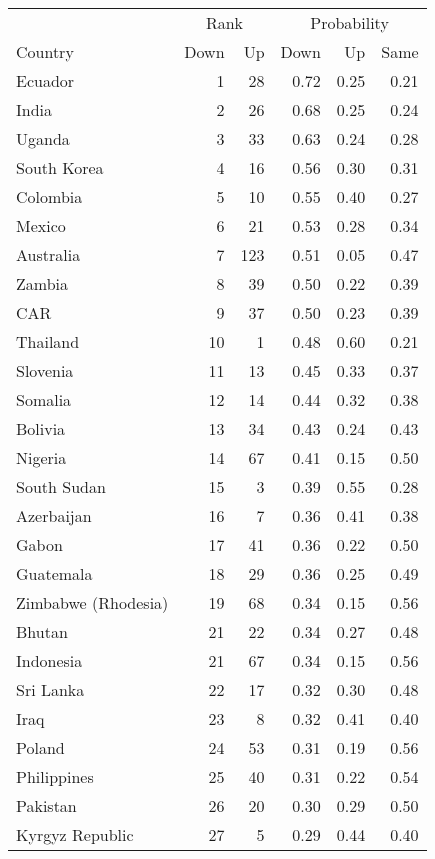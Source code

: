 
\begin{longtable}[t]{lrrrrr}
\toprule
\multicolumn{1}{c}{ } & \multicolumn{2}{c}{Rank} & \multicolumn{3}{c}{Probability} \\
\cmidrule(l{3pt}r{3pt}){2-3} \cmidrule(l{3pt}r{3pt}){4-6}
Country & Down & Up & Down & Up & Same\\
\midrule
Ecuador & 1 & 28 & 0.72 & 0.25 & 0.21\\
India & 2 & 26 & 0.68 & 0.25 & 0.24\\
Uganda & 3 & 33 & 0.63 & 0.24 & 0.28\\
South Korea & 4 & 16 & 0.56 & 0.30 & 0.31\\
Colombia & 5 & 10 & 0.55 & 0.40 & 0.27\\
\addlinespace
Mexico & 6 & 21 & 0.53 & 0.28 & 0.34\\
Australia & 7 & 123 & 0.51 & 0.05 & 0.47\\
Zambia & 8 & 39 & 0.50 & 0.22 & 0.39\\
CAR & 9 & 37 & 0.50 & 0.23 & 0.39\\
Thailand & 10 & 1 & 0.48 & 0.60 & 0.21\\
\addlinespace
Slovenia & 11 & 13 & 0.45 & 0.33 & 0.37\\
Somalia & 12 & 14 & 0.44 & 0.32 & 0.38\\
Bolivia & 13 & 34 & 0.43 & 0.24 & 0.43\\
Nigeria & 14 & 67 & 0.41 & 0.15 & 0.50\\
South Sudan & 15 & 3 & 0.39 & 0.55 & 0.28\\
\addlinespace
Azerbaijan & 16 & 7 & 0.36 & 0.41 & 0.38\\
Gabon & 17 & 41 & 0.36 & 0.22 & 0.50\\
Guatemala & 18 & 29 & 0.36 & 0.25 & 0.49\\
Zimbabwe (Rhodesia) & 19 & 68 & 0.34 & 0.15 & 0.56\\
Bhutan & 21 & 22 & 0.34 & 0.27 & 0.48\\
\addlinespace
Indonesia & 21 & 67 & 0.34 & 0.15 & 0.56\\
Sri Lanka & 22 & 17 & 0.32 & 0.30 & 0.48\\
Iraq & 23 & 8 & 0.32 & 0.41 & 0.40\\
Poland & 24 & 53 & 0.31 & 0.19 & 0.56\\
Philippines & 25 & 40 & 0.31 & 0.22 & 0.54\\
\addlinespace
Pakistan & 26 & 20 & 0.30 & 0.29 & 0.50\\
Kyrgyz Republic & 27 & 5 & 0.29 & 0.44 & 0.40\\

\end{longtable}
